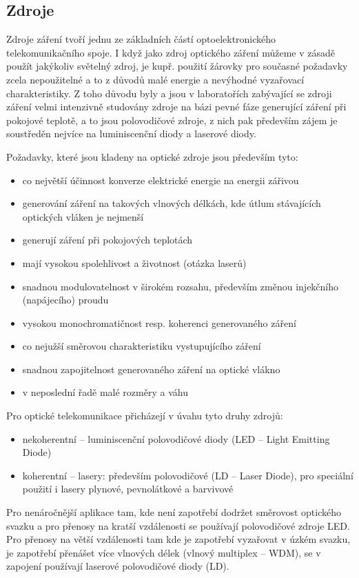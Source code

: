 \subsection{Zdroje}
Zdroje záření tvoří jednu ze základních částí optoelektronického telekomunikačního spoje. I když jako zdroj optického záření můžeme v zásadě použít jakýkoliv světelný zdroj, je kupř. použití žárovky pro současné požadavky zcela nepoužitelné a to z důvodů malé energie a nevýhodné vyzařovací charakteristiky. Z toho důvodu byly a jsou v laboratořích zabývající se zdroji záření velmi intenzivně studovány zdroje na bázi pevné fáze generující záření při pokojové teplotě, a to jsou polovodičové zdroje, z nich pak především zájem je soustředěn nejvíce na luminiscenční diody a laserové diody.

Požadavky, které jsou kladeny na optické zdroje jsou především tyto:
\begin{itemize}
    \item co největší účinnost konverze elektrické energie na energii zářivou
    \item generování záření na takových vlnových délkách, kde útlum stávajících optických vláken je nejmenší
    \item generují záření při pokojových teplotách 
    \item mají vysokou spolehlivost a životnost (otázka laserů)
    \item snadnou modulovatelnost v širokém rozsahu, především změnou injekčního (napájecího) proudu
    \item vysokou monochromatičnost resp. koherenci generovaného záření
    \item co nejužší směrovou charakteristiku vystupujícího záření
    \item snadnou zapojitelnost generovaného záření na optické vlákno
    \item v neposlední řadě malé rozměry a váhu
\end{itemize}

Pro optické telekomunikace přicházejí v úvahu tyto druhy zdrojů:
\begin{itemize}
    \item nekoherentní – luminiscenční polovodičové diody (LED – Light Emitting Diode)
    \item koherentní – lasery: především polovodičové (LD – Laser Diode), pro speciální použití i lasery plynové, pevnolátkové a barvivové
\end{itemize}

Pro nenáročnější aplikace tam, kde není zapotřebí dodržet směrovost optického svazku a pro přenosy na kratší vzdálenosti se používají polovodičové zdroje LED. Pro přenosy na větší vzdálenosti tam kde je zapotřebí vyzařovat v úzkém svazku, je zapotřebí přenášet více vlnových délek (vlnový multiplex – WDM), se v zapojení používají laserové polovodičové diody (LD). 

